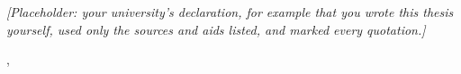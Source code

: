 
\textit{[Placeholder: your university's declaration, for example that you
wrote this thesis yourself, used only the sources and aids listed, and marked
every quotation.]}

\vspace{3\baselineskip}
\noindent\ThesisCity, \ThesisYear\hfill \ThesisAuthor
